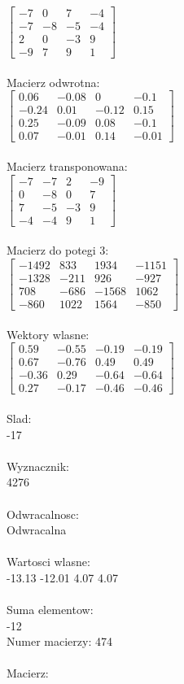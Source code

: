 \documentclass[a4paper,12pt]{article}
\begin{document}
$\begin{bmatrix} -7&0&7&-4\\-7&-8&-5&-4\\2&0&-3&9\\-9&7&9&1 \end{bmatrix}$
\\
\\
Macierz odwrotna:\\

$\begin{bmatrix} 0.06&-0.08&0&-0.1\\-0.24&0.01&-0.12&0.15\\0.25&-0.09&0.08&-0.1\\0.07&-0.01&0.14&-0.01 \end{bmatrix}$
\\
\\
Macierz transponowana:\\

$\begin{bmatrix} -7&-7&2&-9\\0&-8&0&7\\7&-5&-3&9\\-4&-4&9&1 \end{bmatrix}$
\\
\\
Macierz do potegi 3:\\

$\begin{bmatrix} -1492&833&1934&-1151\\-1328&-211&926&-927\\708&-686&-1568&1062\\-860&1022&1564&-850 \end{bmatrix}$
\\
\\
Wektory wlasne:\\

$\begin{bmatrix} 0.59&-0.55&-0.19&-0.19\\0.67&-0.76&0.49&0.49\\-0.36&0.29&-0.64&-0.64\\0.27&-0.17&-0.46&-0.46 \end{bmatrix}$
\\
\\
Slad:\\
-17
\\
\\
Wyznacznik:\\
4276
\\
\\
Odwracalnosc:\\
Odwracalna
\\
\\
Wartosci wlasne:\\
-13.13 -12.01 4.07 4.07
\\
\\
Suma elementow:\\
-12
\\
\newpage
Numer macierzy:
474
\\
\\
Macierz:\\
\end{document}
